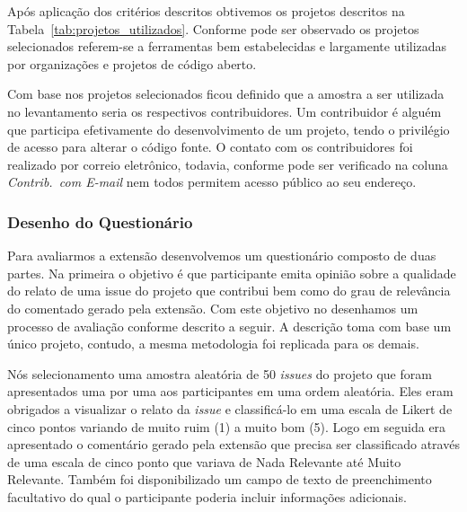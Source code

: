 Após aplicação dos critérios descritos obtivemos os projetos descritos na
Tabela~\ref{tab:projetos_utilizados}. Conforme pode ser observado os projetos
selecionados referem-se a ferramentas bem estabelecidas e largamente utilizadas
por organizações e projetos de código aberto.

\begin{table}[htpb]
\centering
{}
\caption{Projetos utilizados no levantamento com profissionais. Os dados
	apresentados tem como referência 23/04/2017.}
\label{tab:projetos_utilizados}
\end{table}

Com base nos projetos selecionados ficou definido que a amostra a ser utilizada
no levantamento seria os respectivos contribuidores. Um contribuidor é alguém
que participa efetivamente do desenvolvimento de um projeto, tendo o privilégio
de acesso para alterar o código fonte. O contato com os contribuidores foi
realizado por correio eletrônico, todavia, conforme pode ser verificado na
coluna \textit{Contrib.\ com E-mail} nem todos permitem acesso público ao seu
endereço.

\subsubsection{Desenho do Questionário}
\label{ssub:sug_melhoria_desenho_questionario}

Para avaliarmos a extensão desenvolvemos um questionário composto de duas
partes. Na primeira o objetivo é que participante emita opinião sobre a
qualidade do relato de uma issue do projeto que contribui bem como do grau de
relevância do comentado gerado pela extensão. Com este objetivo no desenhamos um
processo de avaliação conforme descrito a seguir. A descrição toma com base um
único projeto, contudo, a mesma metodologia foi replicada para os demais.

Nós selecionamento uma amostra aleatória de 50 \textit{issues} do projeto que
foram apresentados uma por uma aos participantes em uma ordem aleatória. Eles
eram obrigados a visualizar o relato da \textit{issue} e classificá-lo em uma
escala de Likert de cinco pontos variando de muito ruim (1) a muito bom (5).
Logo em seguida era apresentado o comentário gerado pela extensão que precisa
ser classificado através de uma escala de cinco ponto que variava de Nada
Relevante até Muito Relevante. Também foi disponibilizado um campo de texto de
preenchimento facultativo do qual o participante poderia incluir informações
adicionais.

